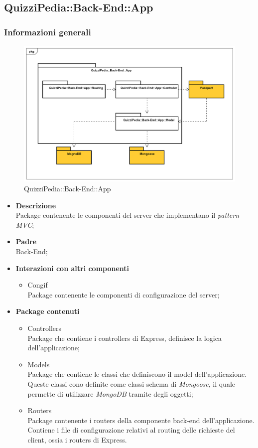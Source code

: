 \subsection{QuizziPedia::Back-End::App}
\subsubsection{Informazioni generali}
\label{QuizziPedia::Back-End::App}
\begin{figure}
	\centering
	\includegraphics[scale=0.45]{UML/Package/QuizziPedia_Back-End_App.png}
	\caption{QuizziPedia::Back-End::App}
\end{figure}
	\begin{itemize}
		\item \textbf{Descrizione} \\
		Package contenente le componenti del server che implementano il \textit{pattern\ped{G} MVC};
		\item \textbf{Padre} \\ Back-End;
		\item \textbf{Interazioni con altri componenti}
			\begin{itemize}
				\item Congif \\
				Package contenente le componenti di configurazione del server;
			\end{itemize}
		\item \textbf{Package contenuti}
			\begin{itemize}
				\item Controllers \\
				Package che contiene i controllers di Express, definisce la logica dell'applicazione;
				\item Models \\
				Package che contiene le classi che definiscono il model dell'applicazione. Queste classi cono definite come classi schema di \textit{Mongoose}, il quale permette di utilizzare \textit{MongoDB} tramite degli oggetti;
				\item Routers \\
				Package contenente i routers della componente back-end dell'applicazione. Contiene i file di configurazione relativi al routing delle richieste del client, ossia i routers di Express.
			\end{itemize}
	\end{itemize}